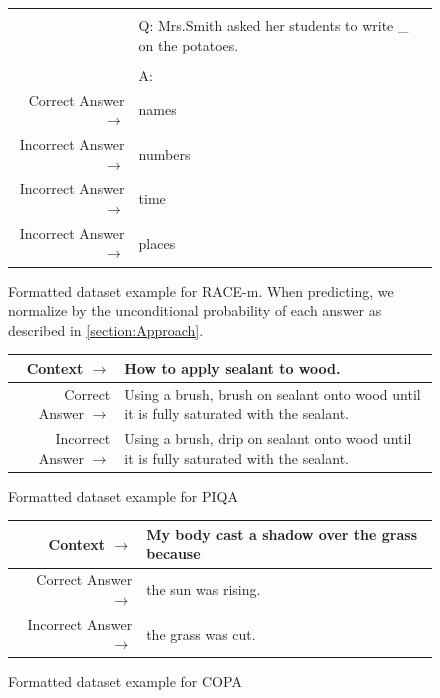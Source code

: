 \documentclass{article}
\begin{document}
\begin{figure}
{\begin{tabularx}{\linewidth}{r X}
 &  \\ 
 & Q: Mrs.Smith asked her students to write    \_  on the potatoes. \\ 
 &  \\ 
 & A: \\ 
 \midrule Correct Answer $\to$ & names \\ 
 Incorrect Answer $\to$ & numbers \\ 
 Incorrect Answer $\to$ & time \\ 
 Incorrect Answer $\to$ & places\\ \bottomrule \end{tabularx} }  \caption{Formatted dataset example for RACE-m. When predicting, we normalize by the unconditional probability of each answer as described in \ref{section:Approach}.}  \label{eval:RACE-m}  \end{figure}
\begin{figure} { \tt \footnotesize \begin{tabularx}{\linewidth}{r X} \toprule Context $\to$ & How to apply sealant to wood. \\ 
 \midrule Correct Answer $\to$ & Using a brush, brush on sealant onto wood until it is fully saturated with the sealant. \\ 
 Incorrect Answer $\to$ & Using a brush, drip on sealant onto wood until it is fully saturated with the sealant.\\ \bottomrule \end{tabularx} }  \caption{Formatted dataset example for PIQA}  \label{eval:PIQA}  \end{figure}
\begin{figure} { \tt \footnotesize \begin{tabularx}{\linewidth}{r X} \toprule Context $\to$ & My body cast a shadow over the grass because \\ 
 \midrule Correct Answer $\to$ & the sun was rising. \\ 
 Incorrect Answer $\to$ & the grass was cut.\\ \bottomrule \end{tabularx} }  \caption{Formatted dataset example for COPA}  \label{eval:COPA}  \end{figure}
\end{document}
